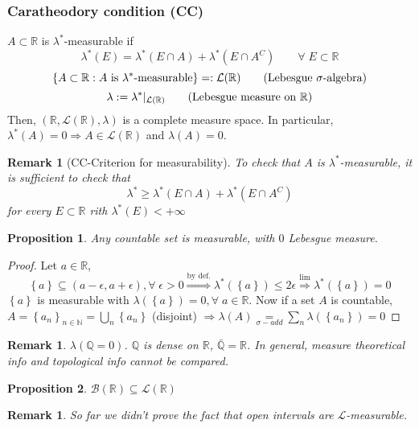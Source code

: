 \documentclass[a4paper,12pt]{article}
\theoremstyle{break}
\newtheorem{proposition}{Proposition}[section]
\newtheorem{remark}[section]{Remark}
\newcommand{\sigalg}{\sigma\mbox{-algebra}}
\newcommand{\boreal}{\mathcal{B}(\mathbb{R})}
\newcommand{\real}{\mathbb{R}}
\numberwithin{equation}{section}
\begin{document}
\subsubsection*{Caratheodory condition (CC)}
\(A \subset \real\) is \(\lambda^*\)-measurable if 
\[
    \lambda^*(E) = \lambda^*(E \cap A) + \lambda^*(E \cap A^C) \qquad \forall \; E \subset \real
\]
\[
    \left\lbrace A \subset \real : A \mbox{ is }\lambda^*\mbox{-measurable} \right\rbrace =: \mathcal{L}(\real)
\tag*{(Lebesgue \(\sigalg\))}\]
\[
    \lambda := \lambda^* \vert_{\mathcal{L}(\real)}
\tag*{(Lebesgue measure on \(\real\))}\]
Then, \((\real, \mathcal{L}(\real), \lambda)\) is a complete measure space. In particular, \(\lambda^*(A) = 0 \Longrightarrow A \in \mathcal{L}(\real)\) and \(\lambda(A) = 0\).
\begin{remark}[CC-Criterion for measurability]
    To check that \(A\) is \(\lambda^*\)-measurable, it is sufficient to check that 
    \[
        \lambda^* \geq \lambda^*(E \cap A) + \lambda^*(E \cap A^C)
    \] for every \(E \subset \real\) rith \(\lambda^*(E) < +\infty\)
\end{remark}
\begin{proposition}
    Any countable set is measurable, with \(0\) Lebesgue measure.
\end{proposition}
\begin{proof}
    Let \(a \in \real\), \[\left\lbrace a \right\rbrace \subseteq (a-\epsilon, a+\epsilon), \forall \; \epsilon > 0 \overset{\mbox{by def.}}{\Longrightarrow} \lambda^*(\left\lbrace a \right\rbrace) \leq 2\epsilon \overset{\mbox{lim}}{\Longrightarrow} \lambda^*(\left\lbrace a \right\rbrace) = 0\]
    \(\left\lbrace a \right\rbrace\) is measurable with \(\lambda(\left\lbrace a \right\rbrace) = 0, \forall \; a \in \real\). Now if a set \(A\) is countable, \(A = \left\lbrace a_n \right\rbrace_{n \in \mathbb{N}} = \bigcup_n \left\lbrace a_n \right\rbrace\) (disjoint) \(\Longrightarrow \lambda(A) \underset{\sigma-add}{=} \sum_n \lambda(\left\lbrace a_n \right\rbrace) = 0\)
\end{proof}
\begin{remark}
    \(\lambda(\mathbb{Q} = 0)\). \(\mathbb{Q}\) is dense on \(\real\), \(\bar{\mathbb{Q}} = \real\). In general, measure theoretical info and topological info cannot be compared.
\end{remark}
\begin{proposition}
    \(\boreal \subseteq \mathcal{L}(\real)\)
\end{proposition}
\begin{remark}
    So far we didn't prove the fact that open intervals are \(\mathcal{L}\)-measurable.
\end{remark}
\end{document}
